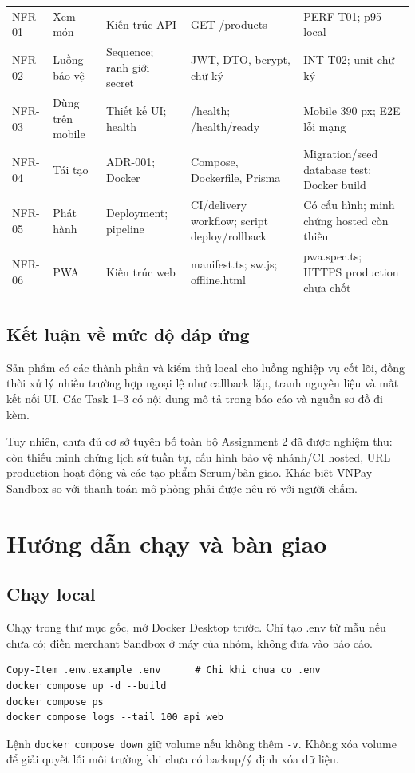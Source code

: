 \documentclass[12pt,a4paper]{article}
\newcommand{\tep}[1]{\nolinkurl{#1}}
\begin{document}
\begin{longtable}{P{1.35cm}P{2.0cm}P{3.0cm}P{4.0cm}P{3.8cm}}
NFR-01&Xem món&Kiến trúc API&GET /products&PERF-T01; p95 local\\
NFR-02&Luồng bảo vệ&Sequence; ranh giới secret&JWT, DTO, bcrypt, chữ ký&INT-T02; unit chữ ký\\
NFR-03&Dùng trên mobile&Thiết kế UI; health&/health; /health/ready&Mobile 390 px; E2E lỗi mạng\\
NFR-04&Tái tạo&ADR-001; Docker&Compose, Dockerfile, Prisma&Migration/seed database test; Docker build\\
NFR-05&Phát hành&Deployment; pipeline&CI/delivery workflow; script deploy/rollback&Có cấu hình; minh chứng hosted còn thiếu\\
NFR-06&PWA&Kiến trúc web&manifest.ts; sw.js; offline.html&pwa.spec.ts; HTTPS production chưa chốt\\
\bottomrule
\end{longtable}
\normalsize
\subsection*{Kết luận về mức độ đáp ứng}
Sản phẩm có các thành phần và kiểm thử local cho luồng nghiệp vụ cốt lõi, đồng thời xử lý nhiều trường hợp ngoại lệ như callback lặp, tranh nguyên liệu và mất kết nối UI. Các Task 1--3 có nội dung mô tả trong báo cáo và nguồn sơ đồ đi kèm.

Tuy nhiên, chưa đủ cơ sở tuyên bố toàn bộ Assignment 2 đã được nghiệm thu: còn thiếu minh chứng lịch sử tuần tự, cấu hình bảo vệ nhánh/CI hosted, URL production hoạt động và các tạo phẩm Scrum/bàn giao. Khác biệt VNPay Sandbox so với thanh toán mô phỏng phải được nêu rõ với người chấm.

\clearpage
\appendix
\section{Hướng dẫn chạy và bàn giao}
\subsection{Chạy local}
Chạy trong thư mục gốc, mở Docker Desktop trước. Chỉ tạo .env từ mẫu nếu chưa có; điền merchant Sandbox ở máy của nhóm, không đưa vào báo cáo.
\begin{verbatim}
Copy-Item .env.example .env      # Chi khi chua co .env
docker compose up -d --build
docker compose ps
docker compose logs --tail 100 api web
\end{verbatim}
Lệnh \tep{docker compose down} giữ volume nếu không thêm \tep{-v}. Không xóa volume để giải quyết lỗi môi trường khi chưa có backup/ý định xóa dữ liệu.
\end{document}
